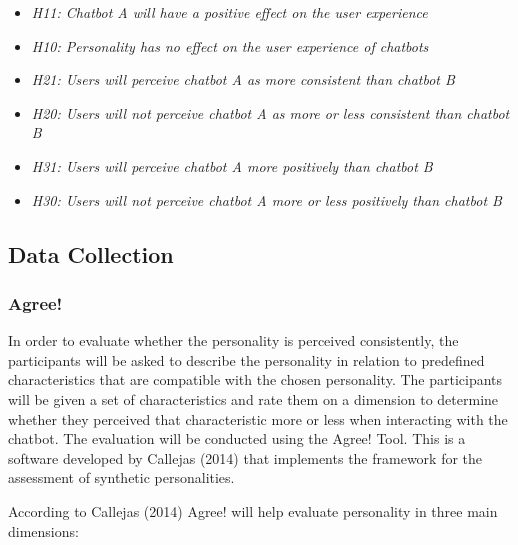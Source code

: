     \begin{itemize}
         \item \textit {H11: Chatbot A will have a positive effect on the user experience}
        \item \textit {H10: Personality has no effect on the user experience of chatbots}
            \vspace{5mm} %

        \item \textit {H21: Users will perceive chatbot A as more consistent than chatbot B}
        \item  \textit {H20: Users will not perceive chatbot A as more or less consistent than chatbot B} 
            \vspace{5mm} %

        \item \textit {H31: Users will perceive chatbot A more positively than chatbot B}
        \item \textit {H30: Users will not perceive chatbot A more or less positively than chatbot B}
    \end{itemize}
    
    \vspace{5mm} %
    
    \subsection{Data Collection}
    
    \vspace{5mm} %

     \subsubsection{Agree!}
     
     In order to evaluate whether the personality is perceived consistently, the participants will be asked to describe the personality in relation to predefined characteristics that are compatible with the chosen personality. The participants will be given a set of characteristics and rate them on a dimension to determine whether they perceived that characteristic more or less when interacting with the chatbot. The evaluation will be conducted using the Agree! Tool. This is a software developed by Callejas (2014) that implements the framework for the assessment of synthetic personalities. %
     
     According to Callejas (2014) Agree! will help evaluate personality in three main dimensions:
    
